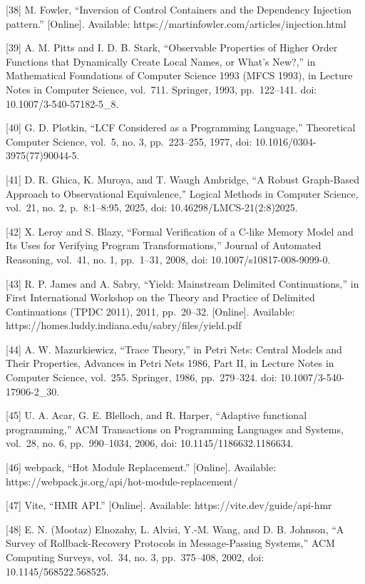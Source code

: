 {[}38{]} M. Fowler, ``Inversion of Control Containers and the Dependency Injection
pattern.'' {[}Online{]}. Available: https://martinfowler.com/articles/injection.html

{[}39{]} A. M. Pitts and I. D. B. Stark, ``Observable Properties of Higher Order
Functions that Dynamically Create Local Names, or What's New?,'' in Mathematical
Foundations of Computer Science 1993 (MFCS 1993), in Lecture Notes in Computer
Science, vol.~711. Springer, 1993, pp.~122--141. doi: 10.1007/3-540-57182-5\_8.

{[}40{]} G. D. Plotkin, ``LCF Considered as a Programming Language,'' Theoretical
Computer Science, vol.~5, no. 3, pp.~223--255, 1977, doi: 10.1016/0304-3975(77)90044-5.

{[}41{]} D. R. Ghica, K. Muroya, and T. Waugh Ambridge, ``A Robust Graph-Based
Approach to Observational Equivalence,'' Logical Methods in Computer Science,
vol.~21, no. 2, p.~8:1--8:95, 2025, doi: 10.46298/LMCS-21(2:8)2025.

{[}42{]} X. Leroy and S. Blazy, ``Formal Verification of a C-like Memory Model and
Its Uses for Verifying Program Transformations,'' Journal of Automated Reasoning,
vol.~41, no. 1, pp.~1--31, 2008, doi: 10.1007/s10817-008-9099-0.

{[}43{]} R. P. James and A. Sabry, ``Yield: Mainstream Delimited Continuations,'' in
First International Workshop on the Theory and Practice of Delimited Continuations
(TPDC 2011), 2011, pp.~20--32. {[}Online{]}. Available:
https://homes.luddy.indiana.edu/sabry/files/yield.pdf

{[}44{]} A. W. Mazurkiewicz, ``Trace Theory,'' in Petri Nets: Central Models and
Their Properties, Advances in Petri Nets 1986, Part II, in Lecture Notes in Computer
Science, vol.~255. Springer, 1986, pp.~279--324. doi: 10.1007/3-540-17906-2\_30.

{[}45{]} U. A. Acar, G. E. Blelloch, and R. Harper, ``Adaptive functional
programming,'' ACM Transactions on Programming Languages and Systems, vol.~28,
no. 6, pp.~990--1034, 2006, doi: 10.1145/1186632.1186634.

{[}46{]} webpack, ``Hot Module Replacement.'' {[}Online{]}. Available:
https://webpack.js.org/api/hot-module-replacement/

{[}47{]} Vite, ``HMR API.'' {[}Online{]}. Available: https://vite.dev/guide/api-hmr

{[}48{]} E. N. (Mootaz) Elnozahy, L. Alvisi, Y.-M. Wang, and D. B. Johnson, ``A
Survey of Rollback-Recovery Protocols in Message-Passing Systems,'' ACM Computing
Surveys, vol.~34, no. 3, pp.~375--408, 2002, doi: 10.1145/568522.568525.

